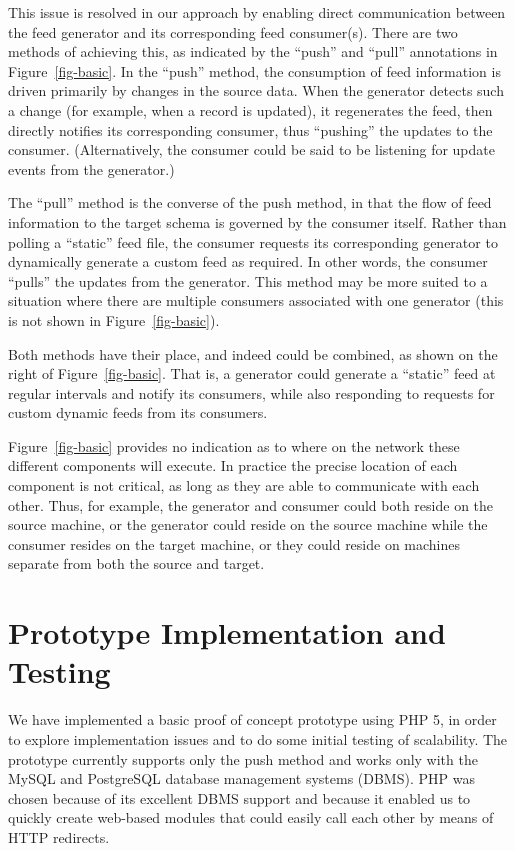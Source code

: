 \documentclass{CRPITStyle}
\begin{document}
This issue is resolved in our approach by enabling direct communication
between the feed generator and its corresponding feed consumer(s). There
are two methods of achieving this, as indicated by the ``push'' and
``pull'' annotations in Figure~\ref{fig-basic}. In the ``push'' method,
the consumption of feed information is driven primarily by changes in
the source data. When the generator detects such a change (for example,
when a record is updated), it regenerates the feed, then directly
notifies its corresponding consumer, thus ``pushing'' the updates to the
consumer. (Alternatively, the consumer could be said to be listening for
update events from the generator.)

The ``pull'' method is the converse of the push method, in that the flow
of feed information to the target schema is governed by the consumer
itself. Rather than polling a ``static'' feed file, the consumer
requests its corresponding generator to dynamically generate a custom
feed as required. In other words, the consumer ``pulls'' the updates
from the generator. This method may be more suited to a situation where
there are multiple consumers associated with one generator (this is not
shown in Figure~\ref{fig-basic}).

Both methods have their place, and indeed could be combined, as shown on
the right of Figure~\ref{fig-basic}. That is, a generator could generate
a ``static'' feed at regular intervals and notify its consumers, while
also responding to requests for custom dynamic feeds from its consumers.

Figure~\ref{fig-basic} provides no indication as to where on the network
these different components will execute. In practice the precise
location of each component is not critical, as long as they are able to
communicate with each other. Thus, for example, the generator and
consumer could both reside on the source machine, or the generator could
reside on the source machine while the consumer resides on the target
machine, or they could reside on machines separate from both the source
and target.


\section{Prototype Implementation and Testing}
\label{sec-prototype}

We have implemented a basic proof of concept prototype using PHP 5, in
order to explore implementation issues and to do some initial testing of
scalability. The prototype currently supports only the push method and
works only with the MySQL and PostgreSQL database management systems
(DBMS). PHP was chosen because of its excellent DBMS support and
because it enabled us to quickly create web-based modules that could
easily call each other by means of HTTP redirects.
\end{document}
